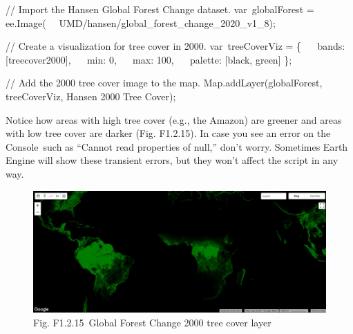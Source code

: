 \documentclass[
  letterpaper,
  DIV=11,
  numbers=noendperiod]{scrreprt}
\newenvironment{Shaded}{\begin{snugshade}}{\end{snugshade}}
\newcommand{\BuiltInTok}[1]{\textcolor[rgb]{0.00,0.23,0.31}{#1}}
\newcommand{\CommentTok}[1]{\textcolor[rgb]{0.37,0.37,0.37}{#1}}
\newcommand{\DataTypeTok}[1]{\textcolor[rgb]{0.68,0.00,0.00}{#1}}
\newcommand{\DecValTok}[1]{\textcolor[rgb]{0.68,0.00,0.00}{#1}}
\newcommand{\FunctionTok}[1]{\textcolor[rgb]{0.28,0.35,0.67}{#1}}
\newcommand{\NormalTok}[1]{\textcolor[rgb]{0.00,0.23,0.31}{#1}}
\newcommand{\OperatorTok}[1]{\textcolor[rgb]{0.37,0.37,0.37}{#1}}
\newcommand{\StringTok}[1]{\textcolor[rgb]{0.13,0.47,0.30}{#1}}
\begin{document}
\begin{Shaded}
\begin{Highlighting}[]
\CommentTok{// Import the Hansen Global Forest Change dataset.  }
\NormalTok{var globalForest }\OperatorTok{=}\NormalTok{ ee}\OperatorTok{.}\FunctionTok{Image}\NormalTok{(   }\StringTok{\textquotesingle{}UMD/hansen/global\_forest\_change\_2020\_v1\_8\textquotesingle{}}\NormalTok{)}\OperatorTok{;}  
  
\CommentTok{// Create a visualization for tree cover in 2000.  }
\NormalTok{var treeCoverViz }\OperatorTok{=}\NormalTok{ \{  }
  \DataTypeTok{ bands}\OperatorTok{:}\NormalTok{ [}\StringTok{\textquotesingle{}treecover2000\textquotesingle{}}\NormalTok{]}\OperatorTok{,}  
  \DataTypeTok{ min}\OperatorTok{:} \DecValTok{0}\OperatorTok{,}  
  \DataTypeTok{ max}\OperatorTok{:} \DecValTok{100}\OperatorTok{,}  
  \DataTypeTok{ palette}\OperatorTok{:}\NormalTok{ [}\StringTok{\textquotesingle{}black\textquotesingle{}}\OperatorTok{,} \StringTok{\textquotesingle{}green\textquotesingle{}}\NormalTok{]  }
\NormalTok{\}}\OperatorTok{;}  
  
\CommentTok{// Add the 2000 tree cover image to the map.  }
\BuiltInTok{Map}\OperatorTok{.}\FunctionTok{addLayer}\NormalTok{(globalForest}\OperatorTok{,}\NormalTok{ treeCoverViz}\OperatorTok{,} \StringTok{\textquotesingle{}Hansen 2000 Tree Cover\textquotesingle{}}\NormalTok{)}\OperatorTok{;}
\end{Highlighting}
\end{Shaded}

Notice how areas with high tree cover (e.g., the Amazon) are greener and
areas with low tree cover are darker (Fig. F1.2.15). In case you see an
error on the Console~such as ``Cannot read properties of null,'' don't
worry. Sometimes Earth Engine will show these transient errors, but they
won't affect the script in any way.

\begin{figure}

{\centering \includegraphics{./F1/image68.png}

}

\caption{Fig. F1.2.15~Global Forest Change 2000 tree cover layer}

\end{figure}
\end{document}
